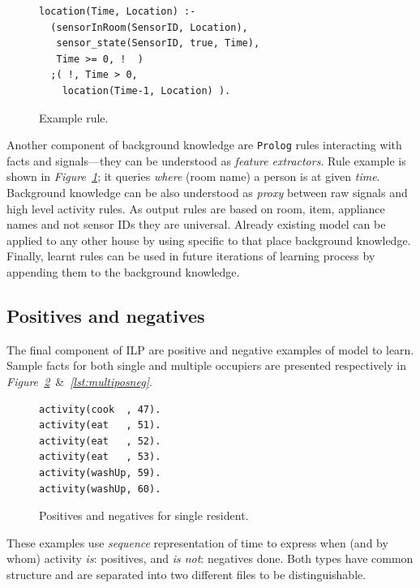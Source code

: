 \documentclass[12pt, a4paper, pdflatex, leqno, twoside, openright]{report}
\begin{document}
\begin{figure}[htb] %
  \begin{verbatim}
location(Time, Location) :-
  (sensorInRoom(SensorID, Location),
   sensor_state(SensorID, true, Time),
   Time >= 0, !  )
  ;( !, Time > 0,
    location(Time-1, Location) ).
  \end{verbatim}
  \caption{Example rule.\label{lst:bg:rule}}
\end{figure}

Another component of background knowledge are \texttt{Prolog} rules interacting with facts and signals---they can be understood as \emph{feature extractors}. Rule example is shown in \emph{Figure~\ref{lst:bg:rule}}; it queries \emph{where} (room name) a person is at given \emph{time}.\\

Background knowledge can be also understood as \emph{proxy} between raw signals and high level activity rules. As output rules are based on room, item, appliance names and not sensor IDs they are universal. Already existing model can be applied to any other house by using specific to that place background knowledge.\\
Finally, learnt rules can be used in future iterations of learning process by appending them to the background knowledge.


    \subsection{Positives and negatives\label{sec:data:posneg}}
The final component of ILP are positive and negative examples of model to learn. Sample facts for both single and multiple occupiers are presented respectively in \emph{Figure~\ref{lst:singleposneg}}~\&~\emph{\ref{lst:multiposneg}}.\\

\begin{figure}[htb] %
  \begin{verbatim}
activity(cook  , 47).
activity(eat   , 51).
activity(eat   , 52).
activity(eat   , 53).
activity(washUp, 59).
activity(washUp, 60).
  \end{verbatim}
  \caption{Positives and negatives for single resident.\label{lst:singleposneg}}
\end{figure}

These examples use \emph{sequence} representation of time to express when (and by whom) activity \emph{is}: positives, and \emph{is not}: negatives done. Both types have common structure and are separated into two different files to be distinguishable.\\
\end{document}

